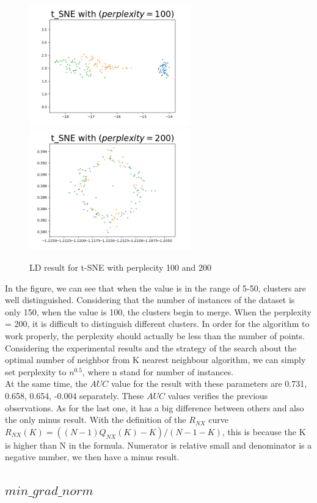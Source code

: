 \begin{figure}[H]
\centering  %
{
\label{Fig.sub.1}
\includegraphics[width=7cm,height=3.5cm\textwidth]{images/image_comparison_tsne_perp100.png}}
{
\label{Fig.sub.2}
\includegraphics[width=7cm,height=3.5cm\textwidth]{images/image_comparison_tsne_perp200.png}}
\caption{LD result for t-SNE with  perplecity 100 and 200}
\end{figure}


\noindent In the figure, we can see that when the value is in the range of 5-50, clusters are well distinguished. Considering that the number of instances of the dataset is only 150, when the value is 100, the clusters begin to merge. When the perplexity = 200, it is difficult to distinguish different clusters. In order for the algorithm to work properly, the perplexity should actually be less than the number of points. Considering the experimental results and the strategy of the search about the optimal number of neighbor from K nearest neighbour algorithm\cite{ref12}, we can simply set perplexity to $n^{0.5}$, where n stand for number of instances. \\

\noindent At the same time, the $AUC$ value for the result with these parameters are 0.731, 0.658, 0.654, -0.004 separately. These $AUC$ values verifies the previous observations. As for the last one, it has a big difference between others and also the only minus result. With the definition of the $R_{NX}$ curve $R_{NX} (K) = ((N − 1)Q_{NX} (K) − K) /(N − 1 − K)$, this is because the K is higher than N in the formula. Numerator is relative small and denominator is a negative number, we then have a minus result.

\subsection{$min\_grad\_norm$}

